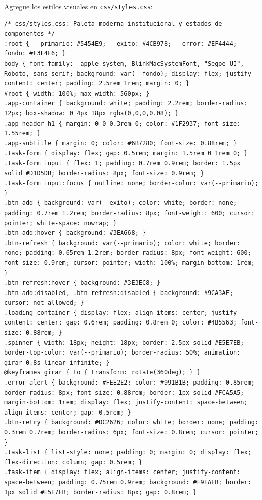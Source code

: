 \documentclass[10pt,letterpaper]{article}
\begin{document}
Agregue los estilos visuales en \texttt{css/styles.css}:

\begin{lstlisting}[style=bashstyle]
/* css/styles.css: Paleta moderna institucional y estados de componentes */
:root { --primario: #5454E9; --exito: #4CB978; --error: #EF4444; --fondo: #F3F4F6; }
body { font-family: -apple-system, BlinkMacSystemFont, "Segoe UI", Roboto, sans-serif; background: var(--fondo); display: flex; justify-content: center; padding: 2.5rem 1rem; margin: 0; }
#root { width: 100%; max-width: 560px; }
.app-container { background: white; padding: 2.2rem; border-radius: 12px; box-shadow: 0 4px 18px rgba(0,0,0,0.08); }
.app-header h1 { margin: 0 0 0.3rem 0; color: #1F2937; font-size: 1.55rem; }
.app-subtitle { margin: 0; color: #6B7280; font-size: 0.88rem; }
.task-form { display: flex; gap: 0.5rem; margin: 1.5rem 0 1rem 0; }
.task-form input { flex: 1; padding: 0.7rem 0.9rem; border: 1.5px solid #D1D5DB; border-radius: 8px; font-size: 0.9rem; }
.task-form input:focus { outline: none; border-color: var(--primario); }
.btn-add { background: var(--exito); color: white; border: none; padding: 0.7rem 1.2rem; border-radius: 8px; font-weight: 600; cursor: pointer; white-space: nowrap; }
.btn-add:hover { background: #3EA668; }
.btn-refresh { background: var(--primario); color: white; border: none; padding: 0.65rem 1.2rem; border-radius: 8px; font-weight: 600; font-size: 0.9rem; cursor: pointer; width: 100%; margin-bottom: 1rem; }
.btn-refresh:hover { background: #3E3EC8; }
.btn-add:disabled, .btn-refresh:disabled { background: #9CA3AF; cursor: not-allowed; }
.loading-container { display: flex; align-items: center; justify-content: center; gap: 0.6rem; padding: 0.8rem 0; color: #4B5563; font-size: 0.88rem; }
.spinner { width: 18px; height: 18px; border: 2.5px solid #E5E7EB; border-top-color: var(--primario); border-radius: 50%; animation: girar 0.8s linear infinite; }
@keyframes girar { to { transform: rotate(360deg); } }
.error-alert { background: #FEE2E2; color: #991B1B; padding: 0.85rem; border-radius: 8px; font-size: 0.88rem; border: 1px solid #FCA5A5; margin-bottom: 1rem; display: flex; justify-content: space-between; align-items: center; gap: 0.5rem; }
.btn-retry { background: #DC2626; color: white; border: none; padding: 0.3rem 0.7rem; border-radius: 6px; font-size: 0.8rem; cursor: pointer; }
.task-list { list-style: none; padding: 0; margin: 0; display: flex; flex-direction: column; gap: 0.5rem; }
.task-item { display: flex; align-items: center; justify-content: space-between; padding: 0.75rem 0.9rem; background: #F9FAFB; border: 1px solid #E5E7EB; border-radius: 8px; gap: 0.8rem; }

\end{lstlisting}
\end{document}
